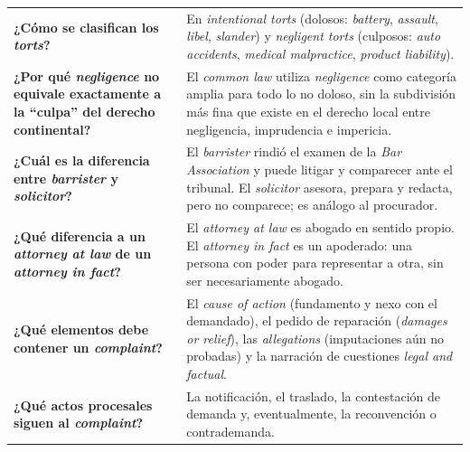 \documentclass[12pt,oneside]{book}
\begin{document}
\begin{table}[H]
\begin{tabularx}{\textwidth}{
    >{\raggedright\arraybackslash}p{}
    >{\raggedright\arraybackslash}X
}
\textbf{¿Cómo se clasifican los \textit{torts}?} &
En \textit{intentional torts} (dolosos: \textit{battery}, \textit{assault}, \textit{libel}, \textit{slander}) y \textit{negligent torts} (culposos: \textit{auto accidents}, \textit{medical malpractice}, \textit{product liability}). \\
\addlinespace

\textbf{¿Por qué \textit{negligence} no equivale exactamente a la ``culpa'' del derecho continental?} &
El \textit{common law} utiliza \textit{negligence} como categoría amplia para todo lo no doloso, sin la subdivisión más fina que existe en el derecho local entre negligencia, imprudencia e impericia. \\
\addlinespace

\textbf{¿Cuál es la diferencia entre \textit{barrister} y \textit{solicitor}?} &
El \textit{barrister} rindió el examen de la \textit{Bar Association} y puede litigar y comparecer ante el tribunal. El \textit{solicitor} asesora, prepara y redacta, pero no comparece; es análogo al procurador. \\
\addlinespace

\textbf{¿Qué diferencia a un \textit{attorney at law} de un \textit{attorney in fact}?} &
El \textit{attorney at law} es abogado en sentido propio. El \textit{attorney in fact} es un apoderado: una persona con poder para representar a otra, sin ser necesariamente abogado. \\
\addlinespace

\textbf{¿Qué elementos debe contener un \textit{complaint}?} &
El \textit{cause of action} (fundamento y nexo con el demandado), el pedido de reparación (\textit{damages or relief}), las \textit{allegations} (imputaciones aún no probadas) y la narración de cuestiones \textit{legal and factual}. \\
\addlinespace

\textbf{¿Qué actos procesales siguen al \textit{complaint}?} &
La notificación, el traslado, la contestación de demanda y, eventualmente, la reconvención o contrademanda. \\

\midrule


\end{tabularx}
\end{table}
\end{document}
